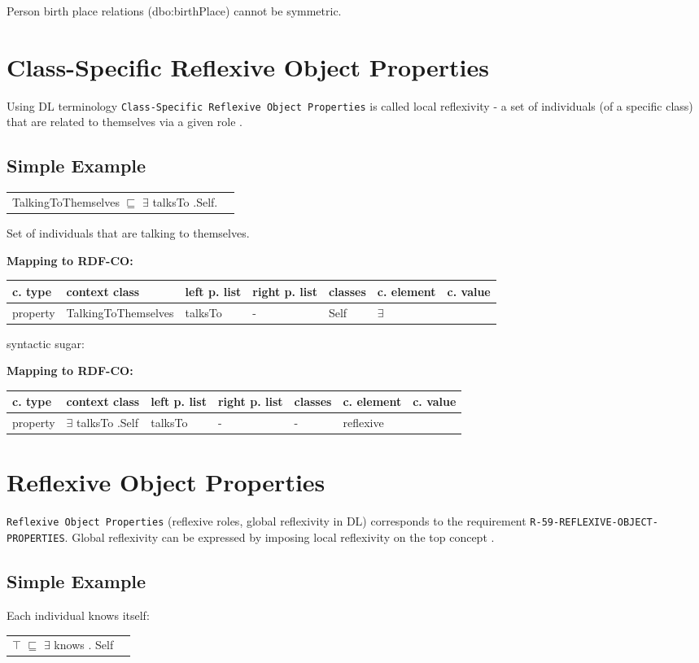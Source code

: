 \documentclass{llncs}
\newcommand{\ms}[1]{\texttt{#1}}
\newenvironment{gcotable}{
  \scriptsize
  \sffamily
  \vspace{0cm}
	\begin{center}
	\textbf{\vspace{0.4cm}Mapping to RDF-CO:} \\
  \begin{tabular}{l|l|l|l|l|l|l}
	\hline
  \textbf{c. type} & \textbf{context class} & \textbf{left p. list} & \textbf{right p. list} & \textbf{classes} & \textbf{c. element} & \textbf{c. value} \\
  \hline

}{
  \hline
  \end{tabular}
	\end{center}
}
\newenvironment{DL}{
  \vspace{0cm}
	\begin{center}
  \begin{tabular}{r l}

}{
  \end{tabular}
	\end{center}
}
\begin{document}
Person birth place relations (dbo:birthPlace) cannot be symmetric.

\section{Class-Specific Reflexive Object Properties}

Using DL terminology \ms{Class-Specific Reflexive Object Properties} is called local reflexivity - a set of individuals (of a specific class) that are related to themselves via a given role \cite{Kroetzsch2012}.

\subsection{Simple Example}

\begin{DL}
TalkingToThemselves $\sqsubseteq$ $\exists$ talksTo .Self. 
\end{DL}

Set of individuals that are talking to themselves.

\begin{gcotable}
property & TalkingToThemselves & talksTo & - & Self & $\exists$ \\
\end{gcotable}

syntactic sugar:

\begin{gcotable}
property & $\exists$ talksTo .Self & talksTo & - & - & reflexive \\
\end{gcotable}


\section{Reflexive Object Properties}

\ms{Reflexive Object Properties} (reflexive roles, global reflexivity in DL) corresponds to the requirement \ms{R-59-REFLEXIVE-OBJECT-PROPERTIES}.
Global reflexivity can be expressed by imposing local reflexivity on the top concept \cite{Kroetzsch2012}.

\subsection{Simple Example}

Each individual knows itself:

\begin{DL}
$\top$ $\sqsubseteq$ $\exists$ knows . Self
\end{DL}
\end{document}
